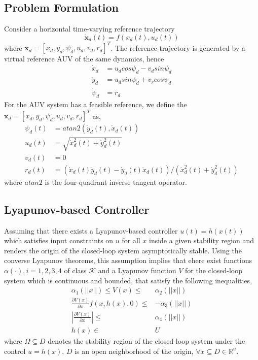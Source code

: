 \documentclass[journal,11pt,draftcls,onecolumn]{IEEEtran}
\begin{document}
\subsection{Problem Formulation}

Consider a horizontal time-varying reference trajectory 
\begin{equation}
\dot{\textbf{x}}_d(t)=f(x_d(t),u_d(t))
\end{equation}
where $\textbf{x}_d=[x_d,y_d,\psi_d,u_d,v_d,r_d]^T$. The reference trajectory is generated by a virtual reference AUV of the same dynamics, hence
\begin{equation}
\begin{split}
\dot{x}_d&=u_dcos\psi_d-v_dsin\psi_d\\
\dot{y}_d&=u_dsin\psi_d+v_rcos\psi_d\\
\dot{\psi}_d&=r_d
\end{split}
\end{equation}
For the AUV system has a feasible reference, we define the $\textbf{x}_d=[x_d,y_d,\psi_d,u_d,v_d,r_d]^T$ as,
\begin{equation}
\begin{split}
\psi_d(t)&=atan2(\dot{y}_d(t),\dot{x}_d(t))\\
u_d(t)&=\sqrt{\dot{x}_d^2(t)+\dot{y}_d^2(t)}\\
v_d(t)&=0\\
r_d(t)&=(\dot{x}_d(t)\ddot{y}_d(t)-\dot{y}_d(t)\ddot{x}_d(t))/(\dot{x}_d^2(t)+\dot{y}_d^2(t))
\end{split}
\end{equation}
where $atan2$ is the four-quadrant inverse tangent operator.

\subsection{Lyapunov-based Controller}
Assuming that there exists a Lyapunov-based controller $u(t)=h(x(t))$ which satisfies input constraints on $u$ for all $x$ inside a given stability region and renders the origin of the closed-loop system asymptotically stable. Using the converse Lyapunov theorems, this assumption implies that ehere exist functions $\alpha(\cdot), i=1,2,3,4$ of class $\mathcal{K}$ and a Lyapunov function $V$ for the closed-loop system which is continuous and bounded, that satisfy the following inequalities,
\begin{equation}
\begin{split}
\alpha_1(||x||)\leq V(x)\leq& \alpha_2(||x||)\\
\frac{\partial V(x)}{\partial x}f(x,h(x),0)\leq& -\alpha_3(||x||)\\
|\frac{\partial V(x)}{\partial x}|\leq& \alpha_4(||x||)\\
h(x)\in& U
\end{split}
\end{equation}
where $\Omega\subseteq D$ denotes the stability region of the closed-loop system under the control $u=h(x)$, $D$ is an open neighborhood of the origin, $\forall x\subseteq D\in \mathbb{R}^n$.
\end{document}
